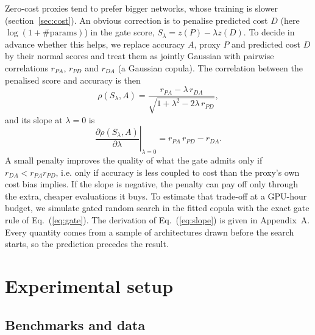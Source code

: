 \documentclass{sadhana}
\begin{document}
Zero-cost proxies tend to prefer bigger networks, whose training is slower (section~\ref{sec:cost}). An obvious correction is to penalise predicted cost $D$ (here $\log(1+\#\text{params})$) in the gate score, $S_\lambda=z(P)-\lambda z(D)$. To decide in advance whether this helps, we replace accuracy $A$, proxy $P$ and predicted cost $D$ by their normal scores and treat them as jointly Gaussian with pairwise correlations $r_{PA}$, $r_{PD}$ and $r_{DA}$ (a Gaussian copula). The correlation between the penalised score and accuracy is then
\begin{equation}
\rho(S_\lambda,A)=\frac{r_{PA}-\lambda\,r_{DA}}{\sqrt{1+\lambda^{2}-2\lambda\,r_{PD}}},\label{eq:corr}
\end{equation}
and its slope at $\lambda=0$ is
\begin{equation}
\left.\frac{\partial\rho(S_\lambda,A)}{\partial\lambda}\right|_{\lambda=0}=r_{PA}\,r_{PD}-r_{DA}.\label{eq:slope}
\end{equation}
A small penalty improves the quality of what the gate admits only if $r_{DA}<r_{PA}r_{PD}$, i.e. only if accuracy is less coupled to cost than the proxy's own cost bias implies. If the slope is negative, the penalty can pay off only through the extra, cheaper evaluations it buys. To estimate that trade-off at a GPU-hour budget, we simulate gated random search in the fitted copula with the exact gate rule of Eq.~(\ref{eq:gate}). The derivation of Eq.~(\ref{eq:slope}) is given in Appendix~A. Every quantity comes from a sample of architectures drawn before the search starts, so the prediction precedes the result.

\section{Experimental setup}\label{sec:setup}

\subsection{Benchmarks and data}\label{sec:data}
\end{document}
